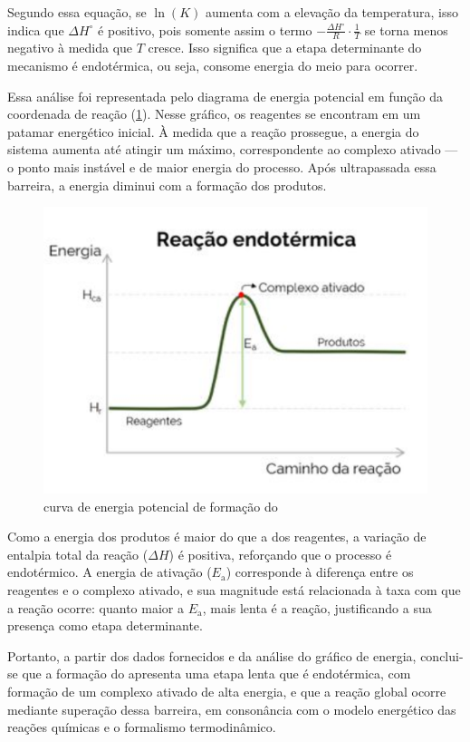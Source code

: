 Segundo essa equação, se \(\ln(K)\) aumenta com a elevação da temperatura, isso indica que \(\Delta H^\circ\) é positivo, pois somente assim o termo \(-\frac{\Delta H^\circ}{R} \cdot \frac{1}{T}\) se torna menos negativo à medida que \(T\) cresce. Isso significa que a etapa determinante do mecanismo é endotérmica, ou seja, consome energia do meio para ocorrer.

Essa análise foi representada pelo diagrama de energia potencial em função da coordenada de reação (\cref{diagrama}). Nesse gráfico, os reagentes se encontram em um patamar energético inicial. À medida que a reação prossegue, a energia do sistema aumenta até atingir um máximo, correspondente ao complexo ativado — o ponto mais instável e de maior energia do processo. Após ultrapassada essa barreira, a energia diminui com a formação dos produtos.

    \begin{figure}[H]
        \centering
        \includegraphics[width=0.35\linewidth]{fig/grafico.png}
        \caption{curva de energia potencial de formação do }
        \label{diagrama}
    \end{figure}

Como a energia dos produtos é maior do que a dos reagentes, a variação de entalpia total da reação (\(\Delta H\)) é positiva, reforçando que o processo é endotérmico. A energia de ativação (\(E_\text{a}\)) corresponde à diferença entre os reagentes e o complexo ativado, e sua magnitude está relacionada à taxa com que a reação ocorre: quanto maior a \(E_\text{a}\), mais lenta é a reação, justificando a sua presença como etapa determinante.

Portanto, a partir dos dados fornecidos e da análise do gráfico de energia, conclui-se que a formação do  apresenta uma etapa lenta que é endotérmica, com formação de um complexo ativado de alta energia, e que a reação global ocorre mediante superação dessa barreira, em consonância com o modelo energético das reações químicas e o formalismo termodinâmico.
